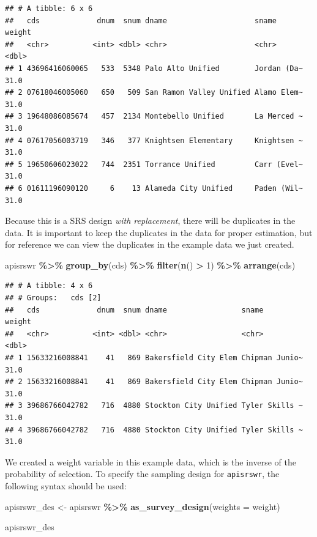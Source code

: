 \documentclass[
]{krantz}
\makeatletter
\newenvironment{Shaded}{\begin{snugshade}}{\end{snugshade}}
\newcommand{\AttributeTok}[1]{\textcolor[rgb]{0.27,0.27,0.27}{#1}}
\newcommand{\DecValTok}[1]{\textcolor[rgb]{0.06,0.06,0.06}{#1}}
\newcommand{\FunctionTok}[1]{\textcolor[rgb]{0.27,0.27,0.27}{\textbf{#1}}}
\newcommand{\NormalTok}[1]{#1}
\newcommand{\OtherTok}[1]{\textcolor[rgb]{0.37,0.37,0.37}{#1}}
\newcommand{\SpecialCharTok}[1]{\textcolor[rgb]{0.43,0.43,0.43}{\textbf{#1}}}
\newenvironment{kframe}{%
\medskip{}
\setlength{\fboxsep}{.8em}
 \def\at@end@of@kframe{}%
 \ifinner\ifhmode%
  \def\at@end@of@kframe{\end{minipage}}%
  \begin{minipage}{\columnwidth}%
 \fi\fi%
 \def\FrameCommand##1{\hskip\@totalleftmargin \hskip-\fboxsep
 \colorbox{shadecolor}{##1}\hskip-\fboxsep
     \hskip-\linewidth \hskip-\@totalleftmargin \hskip\columnwidth}%
 \MakeFramed {\advance\hsize-\width
   \@totalleftmargin\z@ \linewidth\hsize
   \@setminipage}}%
 {\par\unskip\endMakeFramed%
 \at@end@of@kframe}
\renewenvironment{Shaded}{\begin{kframe}}{\end{kframe}}
\makeatother
\begin{document}
\begin{verbatim}
## # A tibble: 6 x 6
##   cds             dnum  snum dname                    sname       weight
##   <chr>          <int> <dbl> <chr>                    <chr>        <dbl>
## 1 43696416060065   533  5348 Palo Alto Unified        Jordan (Da~   31.0
## 2 07618046005060   650   509 San Ramon Valley Unified Alamo Elem~   31.0
## 3 19648086085674   457  2134 Montebello Unified       La Merced ~   31.0
## 4 07617056003719   346   377 Knightsen Elementary     Knightsen ~   31.0
## 5 19650606023022   744  2351 Torrance Unified         Carr (Evel~   31.0
## 6 01611196090120     6    13 Alameda City Unified     Paden (Wil~   31.0
\end{verbatim}

Because this is a SRS design \emph{with replacement}, there will be duplicates in the data. It is important to keep the duplicates in the data for proper estimation, but for reference we can view the duplicates in the example data we just created.

\begin{Shaded}
\begin{Highlighting}[]
\NormalTok{apisrswr }\SpecialCharTok{\%\textgreater{}\%}
  \FunctionTok{group\_by}\NormalTok{(cds) }\SpecialCharTok{\%\textgreater{}\%}
  \FunctionTok{filter}\NormalTok{(}\FunctionTok{n}\NormalTok{() }\SpecialCharTok{\textgreater{}} \DecValTok{1}\NormalTok{) }\SpecialCharTok{\%\textgreater{}\%}
  \FunctionTok{arrange}\NormalTok{(cds)}
\end{Highlighting}
\end{Shaded}

\begin{verbatim}
## # A tibble: 4 x 6
## # Groups:   cds [2]
##   cds             dnum  snum dname                 sname          weight
##   <chr>          <int> <dbl> <chr>                 <chr>           <dbl>
## 1 15633216008841    41   869 Bakersfield City Elem Chipman Junio~   31.0
## 2 15633216008841    41   869 Bakersfield City Elem Chipman Junio~   31.0
## 3 39686766042782   716  4880 Stockton City Unified Tyler Skills ~   31.0
## 4 39686766042782   716  4880 Stockton City Unified Tyler Skills ~   31.0
\end{verbatim}

We created a weight variable in this example data, which is the inverse of the probability of selection. To specify the sampling design for \texttt{apisrswr}, the following syntax should be used:

\begin{Shaded}
\begin{Highlighting}[]
\NormalTok{apisrswr\_des }\OtherTok{\textless{}{-}}\NormalTok{ apisrswr }\SpecialCharTok{\%\textgreater{}\%}
  \FunctionTok{as\_survey\_design}\NormalTok{(}\AttributeTok{weights =}\NormalTok{ weight)}

\NormalTok{apisrswr\_des}
\end{Highlighting}
\end{Shaded}
\end{document}
